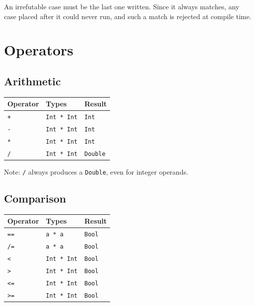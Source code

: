 \documentclass[11pt,a4paper]{article}
\begin{document}
An irrefutable case must be the last one written.  Since it always
matches, any case placed after it could never run, and such a match is
rejected at compile time.

\section{Operators}
\label{sec:operators}

\subsection{Arithmetic}

\begin{center}
\begin{tabular}{lll}
\toprule
\textbf{Operator} & \textbf{Types} & \textbf{Result} \\
\midrule
\texttt{+} & \texttt{Int * Int} & \texttt{Int} \\
\texttt{-} & \texttt{Int * Int} & \texttt{Int} \\
\texttt{*} & \texttt{Int * Int} & \texttt{Int} \\
\texttt{/} & \texttt{Int * Int} & \texttt{Double} \\
\bottomrule
\end{tabular}
\end{center}

Note: \texttt{/} always produces a \texttt{Double}, even for integer operands.

\subsection{Comparison}

\begin{center}
\begin{tabular}{lll}
\toprule
\textbf{Operator} & \textbf{Types} & \textbf{Result} \\
\midrule
\texttt{==} & \texttt{a * a}     & \texttt{Bool} \\
\texttt{/=} & \texttt{a * a}     & \texttt{Bool} \\
\texttt{<}  & \texttt{Int * Int} & \texttt{Bool} \\
\texttt{>}  & \texttt{Int * Int} & \texttt{Bool} \\
\texttt{<=} & \texttt{Int * Int} & \texttt{Bool} \\
\texttt{>=} & \texttt{Int * Int} & \texttt{Bool} \\
\bottomrule
\end{tabular}
\end{center}
\end{document}
